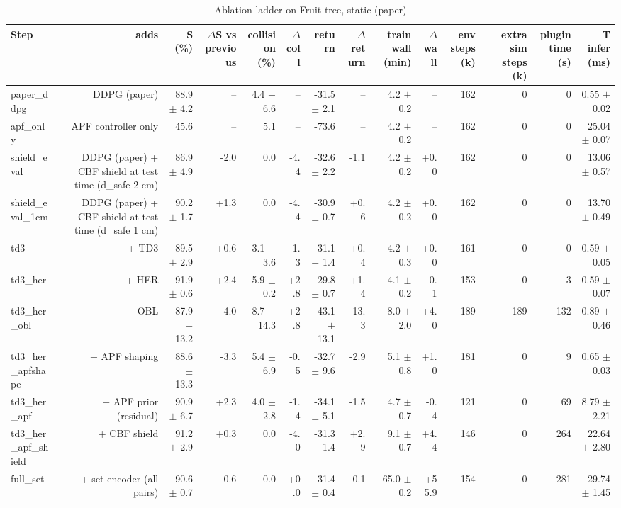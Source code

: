 \begin{table}[t]
\centering
\caption{Ablation ladder on Fruit tree, static (paper)}
\label{tab:ladder_static}
\small
\begin{tabular}{lrrrrrrrrrrrrr}
\toprule
Step & adds & S (\%) & $\Delta$S vs previous & collision (\%) & $\Delta$coll & return & $\Delta$return & train wall (min) & $\Delta$wall & env steps (k) & extra sim steps (k) & plugin time (s) & T infer (ms) \\
\midrule
paper\_ddpg & DDPG (paper) & 88.9 $\pm$ 4.2 & -- & 4.4 $\pm$ 6.6 & -- & -31.5 $\pm$ 2.1 & -- & 4.2 $\pm$ 0.2 & -- & 162 & 0 & 0 & 0.55 $\pm$ 0.02 \\
apf\_only & APF controller only & 45.6 & -- & 5.1 & -- & -73.6 & -- & 4.2 $\pm$ 0.2 & -- & 162 & 0 & 0 & 25.04 $\pm$ 0.07 \\
shield\_eval & DDPG (paper) + CBF shield at test time (d\_safe 2 cm) & 86.9 $\pm$ 4.9 & -2.0 & 0.0 & -4.4 & -32.6 $\pm$ 2.2 & -1.1 & 4.2 $\pm$ 0.2 & +0.0 & 162 & 0 & 0 & 13.06 $\pm$ 0.57 \\
shield\_eval\_1cm & DDPG (paper) + CBF shield at test time (d\_safe 1 cm) & 90.2 $\pm$ 1.7 & +1.3 & 0.0 & -4.4 & -30.9 $\pm$ 0.7 & +0.6 & 4.2 $\pm$ 0.2 & +0.0 & 162 & 0 & 0 & 13.70 $\pm$ 0.49 \\
td3 & + TD3 & 89.5 $\pm$ 2.9 & +0.6 & 3.1 $\pm$ 3.6 & -1.3 & -31.1 $\pm$ 1.4 & +0.4 & 4.2 $\pm$ 0.3 & +0.0 & 161 & 0 & 0 & 0.59 $\pm$ 0.05 \\
td3\_her & + HER & 91.9 $\pm$ 0.6 & +2.4 & 5.9 $\pm$ 0.2 & +2.8 & -29.8 $\pm$ 0.7 & +1.4 & 4.1 $\pm$ 0.2 & -0.1 & 153 & 0 & 3 & 0.59 $\pm$ 0.07 \\
td3\_her\_obl & + OBL & 87.9 $\pm$ 13.2 & -4.0 & 8.7 $\pm$ 14.3 & +2.8 & -43.1 $\pm$ 13.1 & -13.3 & 8.0 $\pm$ 2.0 & +4.0 & 189 & 189 & 132 & 0.89 $\pm$ 0.46 \\
td3\_her\_apfshape & + APF shaping & 88.6 $\pm$ 13.3 & -3.3 & 5.4 $\pm$ 6.9 & -0.5 & -32.7 $\pm$ 9.6 & -2.9 & 5.1 $\pm$ 0.8 & +1.0 & 181 & 0 & 9 & 0.65 $\pm$ 0.03 \\
td3\_her\_apf & + APF prior (residual) & 90.9 $\pm$ 6.7 & +2.3 & 4.0 $\pm$ 2.8 & -1.4 & -34.1 $\pm$ 5.1 & -1.5 & 4.7 $\pm$ 0.7 & -0.4 & 121 & 0 & 69 & 8.79 $\pm$ 2.21 \\
td3\_her\_apf\_shield & + CBF shield & 91.2 $\pm$ 2.9 & +0.3 & 0.0 & -4.0 & -31.3 $\pm$ 1.4 & +2.9 & 9.1 $\pm$ 0.7 & +4.4 & 146 & 0 & 264 & 22.64 $\pm$ 2.80 \\
full\_set & + set encoder (all pairs) & 90.6 $\pm$ 0.7 & -0.6 & 0.0 & +0.0 & -31.4 $\pm$ 0.4 & -0.1 & 65.0 $\pm$ 0.2 & +55.9 & 154 & 0 & 281 & 29.74 $\pm$ 1.45 \\

\end{tabular}
\end{table}
